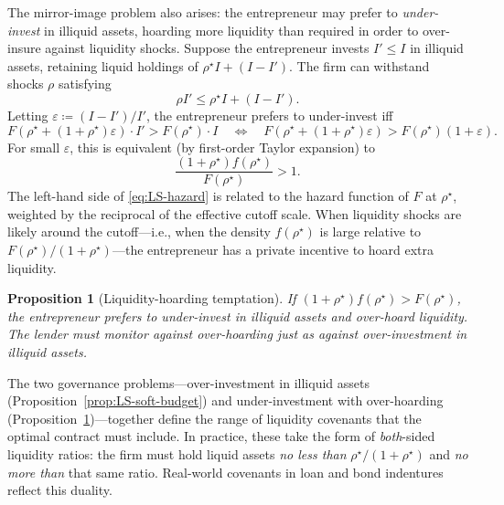 \documentclass[11pt,a4paper,oneside]{book}
\def\leq{\leqslant}
\theoremstyle{plain}
\newtheorem{proposition}[theorem]{Proposition}
\theoremstyle{definition}
\theoremstyle{remark}
\numberwithin{equation}{chapter}
\begin{document}
The mirror-image problem also arises: the entrepreneur may prefer to \emph{under-invest} in illiquid assets, hoarding more liquidity than required in order to over-insure against liquidity shocks.
Suppose the entrepreneur invests $I' \leq I$ in illiquid assets, retaining liquid holdings of $\rho^\star I + (I - I')$.
The firm can withstand shocks $\rho$ satisfying
\begin{equation*}
  \rho I' \leq \rho^\star I + (I - I').
\end{equation*}
Letting $\varepsilon \coloneqq (I - I')/I'$, the entrepreneur prefers to under-invest iff
\begin{equation}\label{eq:LS-under-invest}
  F(\rho^\star + (1 + \rho^\star)\varepsilon) \cdot I' > F(\rho^\star) \cdot I
  \quad\Leftrightarrow\quad
  F(\rho^\star + (1 + \rho^\star)\varepsilon) > F(\rho^\star)(1 + \varepsilon).
\end{equation}
For small $\varepsilon$, this is equivalent (by first-order Taylor expansion) to
\begin{equation}\label{eq:LS-hazard}
  \frac{(1 + \rho^\star) f(\rho^\star)}{F(\rho^\star)} > 1.
\end{equation}
The left-hand side of \eqref{eq:LS-hazard} is related to the hazard function of $F$ at $\rho^\star$, weighted by the reciprocal of the effective cutoff scale.
When liquidity shocks are likely around the cutoff---i.e., when the density $f(\rho^\star)$ is large relative to $F(\rho^\star)/(1 + \rho^\star)$---the entrepreneur has a private incentive to hoard extra liquidity.

\begin{proposition}[Liquidity-hoarding temptation]\label{prop:LS-hoarding}
If $(1 + \rho^\star) f(\rho^\star) > F(\rho^\star)$, the entrepreneur prefers to under-invest in illiquid assets and over-hoard liquidity.
The lender must monitor against over-hoarding just as against over-investment in illiquid assets.
\end{proposition}

The two governance problems---over-investment in illiquid assets (Proposition~\ref{prop:LS-soft-budget}) and under-investment with over-hoarding (Proposition~\ref{prop:LS-hoarding})---together define the range of liquidity covenants that the optimal contract must include.
In practice, these take the form of \emph{both}-sided liquidity ratios: the firm must hold liquid assets \emph{no less than} $\rho^\star/(1 + \rho^\star)$ and \emph{no more than} that same ratio.
Real-world covenants in loan and bond indentures reflect this duality.
\end{document}
